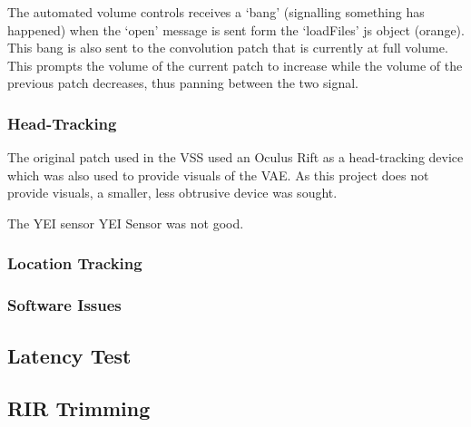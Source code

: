 \documentclass[../../main.tex]{subfiles}
\begin{document}
		 	The automated volume controls receives a `bang' (signalling something has happened) when the `open' message is sent form the `loadFiles' js object (orange). This bang is also sent to the convolution patch that is currently at full volume. This prompts the volume of the current patch to increase while the volume of the previous patch decreases, thus panning between the two signal.

	\subsubsection{Head-Tracking}

		The original patch used in the \ac{VSS} used an Oculus Rift as a head-tracking device which was also used to provide visuals of the \ac{VAE}. As this project does not provide visuals, a smaller, less obtrusive device was sought. \cite{YEI}

		The YEI sensor
		YEI Sensor was not good.

	\subsubsection{Location Tracking}
	\label{locationtracking}

	\subsubsection{Software Issues}
	\label{iteration3Issues}

	\subsection{Latency Test}
	
	\subsection{RIR Trimming}
\end{document}
